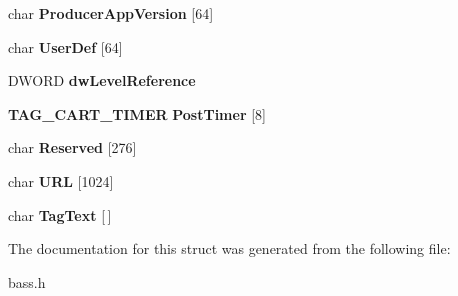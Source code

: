 \begin{DoxyCompactItemize}
\item 
char {\bfseries Producer\+App\+Version} [64]\label{struct_t_a_g___c_a_r_t_a8b74d0fe804ab08b5cac68788704b7e4}

\item 
char {\bfseries User\+Def} [64]\label{struct_t_a_g___c_a_r_t_a0283cb1d4dac674053a4862da0d65837}

\item 
D\+W\+O\+R\+D {\bfseries dw\+Level\+Reference}\label{struct_t_a_g___c_a_r_t_a3776ebc4bdd93cbfc5bb08e101a508fa}

\item 
{\bf T\+A\+G\+\_\+\+C\+A\+R\+T\+\_\+\+T\+I\+M\+E\+R} {\bfseries Post\+Timer} [8]\label{struct_t_a_g___c_a_r_t_a4ef8406d1bb1cfdfde5efa7ece8e29b8}

\item 
char {\bfseries Reserved} [276]\label{struct_t_a_g___c_a_r_t_a2fbf4510eba93d1af704746688a75f76}

\item 
char {\bfseries U\+R\+L} [1024]\label{struct_t_a_g___c_a_r_t_a9982f729f68b2da136291aed1e708bcd}

\item 
char {\bfseries Tag\+Text} [$\,$]\label{struct_t_a_g___c_a_r_t_a972e2ed56e14fba4194c3d03d6eabc3c}

\end{DoxyCompactItemize}


The documentation for this struct was generated from the following file\+:\begin{DoxyCompactItemize}
\item 
bass.\+h\end{DoxyCompactItemize}
